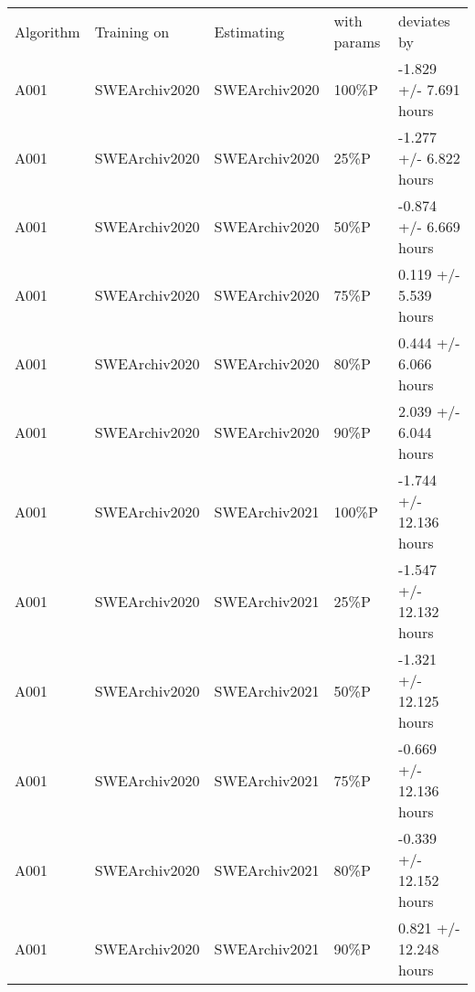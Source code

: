 \begin{tabular}{lllll}
\hline
 Algorithm & Training on   & Estimating    & with params & deviates by             \\
 A001      & SWEArchiv2020 & SWEArchiv2020 & 100\%P       & -1.829 +/- 7.691 hours  \\
 A001      & SWEArchiv2020 & SWEArchiv2020 & 25\%P        & -1.277 +/- 6.822 hours  \\
 A001      & SWEArchiv2020 & SWEArchiv2020 & 50\%P        & -0.874 +/- 6.669 hours  \\
 A001      & SWEArchiv2020 & SWEArchiv2020 & 75\%P        & 0.119 +/- 5.539 hours   \\
 A001      & SWEArchiv2020 & SWEArchiv2020 & 80\%P        & 0.444 +/- 6.066 hours   \\
 A001      & SWEArchiv2020 & SWEArchiv2020 & 90\%P        & 2.039 +/- 6.044 hours   \\
 A001      & SWEArchiv2020 & SWEArchiv2021 & 100\%P       & -1.744 +/- 12.136 hours \\
 A001      & SWEArchiv2020 & SWEArchiv2021 & 25\%P        & -1.547 +/- 12.132 hours \\
 A001      & SWEArchiv2020 & SWEArchiv2021 & 50\%P        & -1.321 +/- 12.125 hours \\
 A001      & SWEArchiv2020 & SWEArchiv2021 & 75\%P        & -0.669 +/- 12.136 hours \\
 A001      & SWEArchiv2020 & SWEArchiv2021 & 80\%P        & -0.339 +/- 12.152 hours \\
 A001      & SWEArchiv2020 & SWEArchiv2021 & 90\%P        & 0.821 +/- 12.248 hours  \\
\hline
\end{tabular}